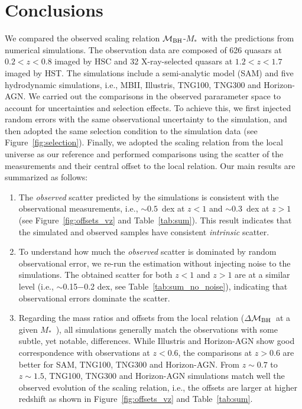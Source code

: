 \documentclass[twocolumn]{aastex631}
\def\smass{{$M_*$}}
\def\mbh{$\mathcal M_{\rm BH}$}
\begin{document}
\section{Conclusions} \label{sec:con}
We compared the observed scaling relation \mbh-\smass\ with the predictions from numerical simulations. The observation data are composed of 626 quasars at $0.2 < z < 0.8$ imaged by HSC and 32 X-ray-selected quasars at $1.2 < z < 1.7$ imaged by HST. The simulations include a semi-analytic model (SAM) and five hydrodynamic simulations, i.e., MBII, Illustris, TNG100, TNG300 and Horizon-AGN. We carried out the comparisons in the observed pararameter space to account for uncertainties and selection effects. To achieve this, we first injected random errors with the same observational uncertainty to the simulation, and then adopted the same selection condition to the simulation data (see Figure~\ref{fig:selection}). Finally, we adopted the scaling relation from the local universe as our reference and performed comparisons using the scatter of the measurements and their central offset to the local relation. Our main results are summarized as follows:

\begin{enumerate}

\item{}The {\it observed} scatter predicted by the simulations is consistent with the observational measurements, i.e., $\sim0.5$~dex at $z<1$ and $\sim0.3$~dex at $z>1$ (see Figure~\ref{fig:offsets_vz} and Table~\ref{tab:sum}). This result indicates that the simulated and observed samples have consistent {\it intrinsic} scatter.

\item{}To understand how much the {\it observed} scatter is dominated by random observational error,
we re-run the estimation without injecting noise to the simulations. The obtained scatter for both $z<1$ and $z>1$ are at a similar level (i.e.,  $\sim$0.15$-$0.2 dex, see Table~\ref{tab:sum_no_noise}), indicating that observational errors dominate the scatter.

\item{} Regarding the mass ratios and offsets from the local relation ($\Delta$\mbh\ at a given \smass\ ), all simulations generally match the observations with some subtle, yet notable, differences. While Illustris and Horizon-AGN show good correspondence with observations at $z<0.6$, the comparisons at $z>0.6$ are better for SAM, TNG100, TNG300 and Horizon-AGN. From $z\sim0.7$ to $z\sim1.5$, TNG100, TNG300 and Horizon-AGN simulations match well the observed evolution of the scaling relation, i.e., the offsets are larger at higher redshift as shown in Figure~\ref{fig:offsets_vz} and Table~\ref{tab:sum}. 

\end{enumerate}
\end{document}
